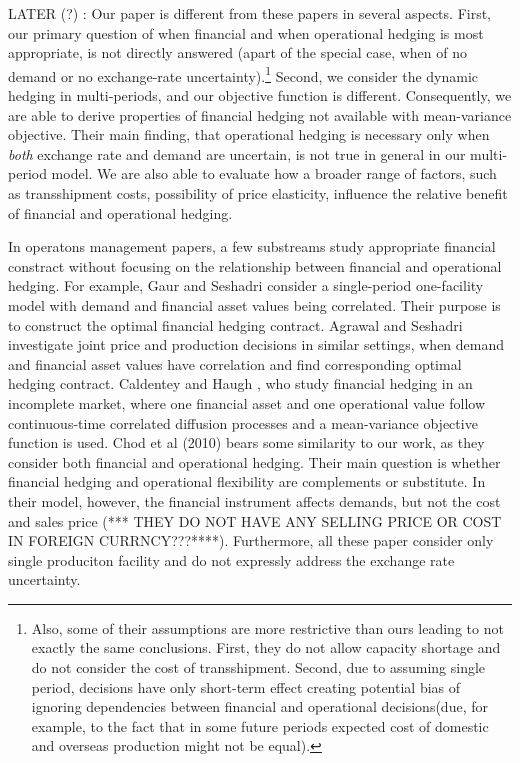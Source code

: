 \documentclass[mnsc,nonblindrev,copyedit]{informs2_wz} %
\begin{document}
LATER (?) : Our paper is different from these papers in several aspects.  First, our primary question of when financial and when operational hedging is most appropriate, is not directly answered (apart of the special case, when of no demand or no exchange-rate uncertainty).\footnote{Also, some of their assumptions are more restrictive than ours leading to not exactly the same conclusions.  First, they do not allow capacity shortage and do not consider the cost of transshipment.  Second, due to assuming single period, decisions have only short-term effect creating potential bias of ignoring dependencies between financial and operational decisions(due, for example, to the fact that in some future periods expected cost of domestic and overseas production might not be equal).}  Second, we consider the dynamic hedging in multi-periods, and our objective function is different.  Consequently, we are able to derive properties of financial hedging not available with mean-variance objective.  Their main finding, that operational hedging is necessary only when {\em both} exchange rate and demand are uncertain, is not true in general in our multi-period model.  We are also able to evaluate how a broader range of factors, such as transshipment costs, possibility of price elasticity, influence the relative benefit of financial and operational hedging.

In operatons management papers, a few substreams study appropriate financial constract without focusing on the relationship between financial and operational hedging.  For example, Gaur and Seshadri \cite{Guar2004} consider a single-period one-facility model with demand and financial asset values being correlated.  Their purpose is to construct the optimal financial hedging contract.  Agrawal and Seshadri \cite{Agrawal2000} investigate joint price and production decisions in similar settings, when demand and financial asset values have correlation and find corresponding optimal hedging contract. Caldentey and Haugh \cite{Caldentey}, who study financial hedging in an incomplete market, where one financial asset and one operational value follow continuous-time correlated diffusion processes and a mean-variance objective function is used.  Chod et al (2010) bears some similarity to our work, as they consider both financial and operational hedging.  Their main question is whether financial hedging and operational flexibility are complements or substitute. In their model, however, the financial instrument affects demands, but not the cost and sales price (*** THEY DO NOT HAVE ANY SELLING PRICE OR COST IN FOREIGN CURRNCY???****). Furthermore, all these paper consider only single produciton facility and do not expressly address the exchange rate uncertainty.
\end{document}

